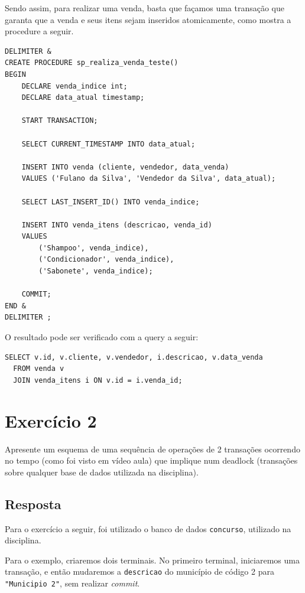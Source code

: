 \documentclass[article, a4paper, oneside, 11pt, english, brazil, sumario=tradicional]{abntex2}
\begin{document}
Sendo  assim, para  realizar  uma venda,  basta que  façamos  uma transação  que
garanta que  a venda e  seus itens sejam  inseridos atomicamente, como  mostra a
procedure a seguir.

\begin{verbatim}
DELIMITER &
CREATE PROCEDURE sp_realiza_venda_teste()
BEGIN
    DECLARE venda_indice int;
    DECLARE data_atual timestamp;

    START TRANSACTION;

    SELECT CURRENT_TIMESTAMP INTO data_atual;

    INSERT INTO venda (cliente, vendedor, data_venda)
    VALUES ('Fulano da Silva', 'Vendedor da Silva', data_atual);

    SELECT LAST_INSERT_ID() INTO venda_indice;

    INSERT INTO venda_itens (descricao, venda_id)
    VALUES
        ('Shampoo', venda_indice),
        ('Condicionador', venda_indice),
        ('Sabonete', venda_indice);

    COMMIT;
END &
DELIMITER ;
\end{verbatim}

O resultado pode ser verificado com a query a seguir:

\begin{verbatim}
SELECT v.id, v.cliente, v.vendedor, i.descricao, v.data_venda
  FROM venda v
  JOIN venda_itens i ON v.id = i.venda_id;
\end{verbatim}

\section{Exercício 2}
\label{sec:orgba44280}

Apresente um esquema de uma sequência  de operações de 2 transações ocorrendo no
tempo (como foi visto em vídeo aula) que implique num deadlock (transações sobre
qualquer base de dados utilizada na disciplina).

\subsection{Resposta}
\label{sec:org8090498}

Para o exercício a seguir, foi utilizado  o banco de dados \texttt{concurso}, utilizado na
disciplina.

Para o exemplo, criaremos dois  terminais. No primeiro terminal, iniciaremos uma
transação,  e então  mudaremos  a  \texttt{descricao} do  município  de  código 2  para
\texttt{"Municipio 2"}, sem realizar \emph{commit}.
\end{document}
